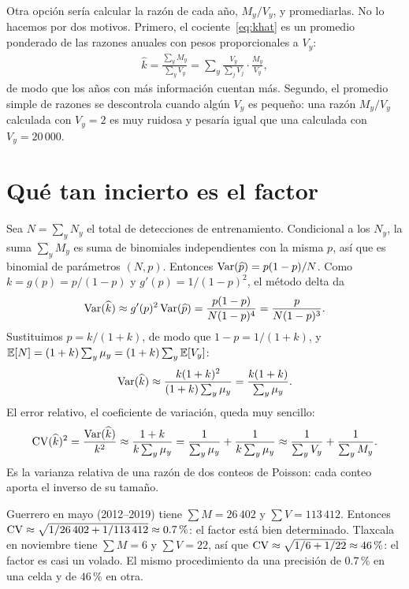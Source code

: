 Otra opción sería calcular la razón de cada año, $M_y/V_y$, y promediarlas. No lo hacemos por dos motivos. Primero, el cociente~\eqref{eq:khat} es un promedio ponderado de las razones anuales con pesos proporcionales a $V_y$:
\begin{align*}
  \widehat{k}=\frac{\sum_y M_y}{\sum_y V_y}=\sum_y\frac{V_y}{\sum_j V_j}\cdot\frac{M_y}{V_y},
\end{align*}
de modo que los años con más información cuentan más. Segundo, el promedio simple de razones se descontrola cuando algún $V_y$ es pequeño: una razón $M_y/V_y$ calculada con $V_y=2$ es muy ruidosa y pesaría igual que una calculada con $V_y=20\,000$.

\section{Qué tan incierto es el factor}\label{sec:var}

Sea $N=\sum_y N_y$ el total de detecciones de entrenamiento. Condicional a los $N_y$, la suma $\sum_y M_y$ es suma de binomiales independientes con la misma $p$, así que es binomial de parámetros $(N,p)$. Entonces $\operatorname{Var}(\widehat p)=p(1-p)/N$. Como $k=g(p)=p/(1-p)$ y $g'(p)=1/(1-p)^2$, el método delta da
\begin{align*}
  \operatorname{Var}(\widehat k)\approx g'(p)^2\operatorname{Var}(\widehat p)
  =\frac{p(1-p)}{N(1-p)^4}=\frac{p}{N(1-p)^3}.
\end{align*}
Sustituimos $p=k/(1+k)$, de modo que $1-p=1/(1+k)$, y $\mathbb{E}[N]=(1+k)\sum_y\mu_y=(1+k)\sum_y\mathbb{E}[V_y]$:
\begin{align*}
  \operatorname{Var}(\widehat k)\approx\frac{k(1+k)^{2}}{(1+k)\sum_y \mu_y}=\frac{k(1+k)}{\sum_y\mu_y}.
\end{align*}
El error relativo, el coeficiente de variación, queda muy sencillo:
\begin{align}
  \operatorname{CV}(\widehat k)^2=\frac{\operatorname{Var}(\widehat k)}{k^2}\approx\frac{1+k}{k\sum_y\mu_y}
  =\frac{1}{\sum_y \mu_y}+\frac{1}{k\sum_y\mu_y}
  \approx\frac{1}{\sum_y V_y}+\frac{1}{\sum_y M_y}.\label{eq:cv}
\end{align}
Es la varianza relativa de una razón de dos conteos de Poisson: cada conteo aporta el inverso de su tamaño.

\begin{ejemplo}
Guerrero en mayo (2012--2019) tiene $\sum M=26\,402$ y $\sum V=113\,412$. Entonces $\operatorname{CV}\approx\sqrt{1/26\,402+1/113\,412}\approx0.7\,\%$: el factor está bien determinado. Tlaxcala en noviembre tiene $\sum M=6$ y $\sum V=22$, así que $\operatorname{CV}\approx\sqrt{1/6+1/22}\approx46\,\%$: el factor es casi un volado. El mismo procedimiento da una precisión de $0.7\,\%$ en una celda y de $46\,\%$ en otra.
\end{ejemplo}

